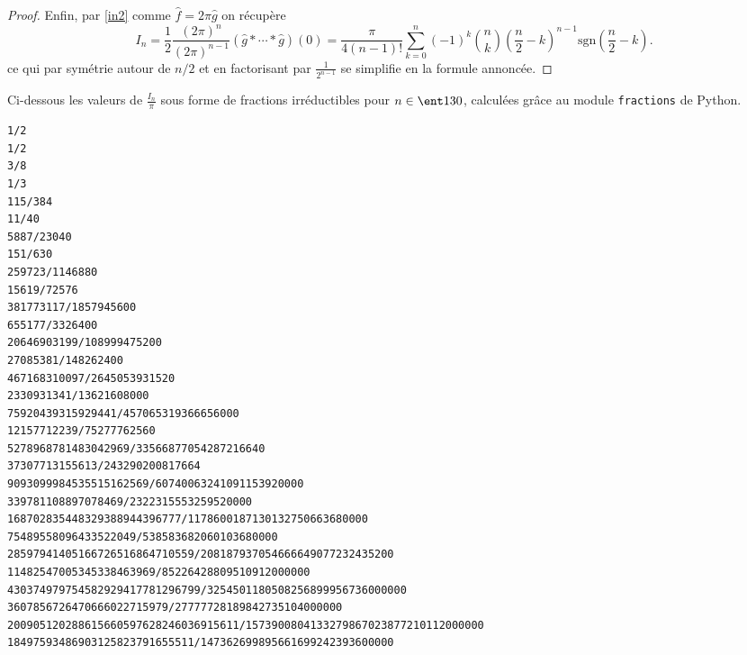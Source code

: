 \documentclass{notes}
\begin{document}
\begin{proof}
  Enfin, par \eqref{in2} comme $\hat f = 2\pi \hat g$ on récupère 
  \[ I_n = \frac 12 \frac{(2\pi)^{n}}{(2\pi)^{n-1}} \left( \hat g\ast \cdots \ast \hat  g \right)(0)  =  \frac{\pi}{4(n-1)!}  \sum_{k=0}^{n} (-1)^{k}\binom nk \left( \frac n2 - k \right)^{n-1}\mathrm{sgn}\left( \frac n2 - k \right) .  \]
  ce qui par symétrie autour de $n/2$ et en factorisant par $\frac 1{2^{n-1}}$ se simplifie en la formule annoncée.

\end{proof}

Ci-dessous les valeurs de $\frac{I_n}{\pi}$ sous forme de fractions irréductibles pour $n\in \ent 1{30}$, calculées grâce au module \verb+fractions+ de Python.

\begin{lstlisting}
1/2
1/2
3/8
1/3
115/384
11/40
5887/23040
151/630
259723/1146880
15619/72576
381773117/1857945600
655177/3326400
20646903199/108999475200
27085381/148262400
467168310097/2645053931520
2330931341/13621608000
75920439315929441/457065319366656000
12157712239/75277762560
5278968781483042969/33566877054287216640
37307713155613/243290200817664
9093099984535515162569/60740063241091153920000
339781108897078469/2322315553259520000
168702835448329388944396777/1178600187130132750663680000
75489558096433522049/538583682060103680000
28597941405166726516864710559/208187937054666649077232435200
11482547005345338463969/85226428809510912000000
430374979754582929417781296799/3254501180508256899956736000000
3607856726470666022715979/27777728189842735104000000
200905120288615660597628246036915611/1573900804133279867023877210112000000
18497593486903125823791655511/147362699895661699242393600000
\end{lstlisting}



 
\end{document}
